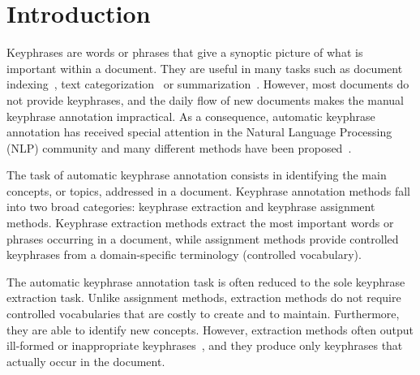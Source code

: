 \section{Introduction}
\label{sec: introduction}
  Keyphrases are words or phrases that give a synoptic picture of what is
  important within a document. They are useful in many tasks such as
  document indexing~\cite{gutwin1999keyphrasesfordigitallibraries}, text
  categorization~\cite{hulth-megyesi:2006:COLACL} or
  summarization~\cite{litvak2008graphbased}. However, most documents do not
  provide keyphrases, and the daily flow of new documents makes the manual
  keyphrase annotation impractical. As a consequence, automatic keyphrase
  annotation has received special attention in the Natural Language
  Processing (NLP) community and many different methods have been 
  proposed~\cite{hasan2014state_of_the_art}.


  The task of automatic keyphrase annotation consists in identifying the main 
  concepts, or topics, addressed in a document.
  Keyphrase annotation methods fall into two broad categories: keyphrase 
  extraction and keyphrase assignment methods.
  Keyphrase extraction methods extract the most important words or phrases
  occurring in a document, while assignment methods provide controlled 
  keyphrases from a domain-specific terminology (controlled vocabulary).

  The automatic keyphrase annotation task is often reduced to the sole 
  keyphrase extraction task.
  Unlike assignment methods, extraction methods do not require controlled 
  vocabularies that are costly to create and to maintain. 
  Furthermore, they are able to identify new concepts.
  However, extraction methods often output ill-formed or inappropriate
  keyphrases~\cite{medelyan2008smalltrainingset}, and they produce only
  keyphrases that actually occur in the document.

